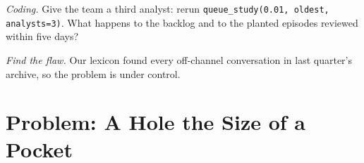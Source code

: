 \begin{exercise}[$\star\star\star$]\label{exo:pl:surveillance-and-compliance-technology:7}
\emph{Coding.} Give the team a third analyst: rerun \texttt{queue\_study(0.01, \textquotedbl oldest\textquotedbl, analysts=3)}.
What happens to the backlog and to the planted episodes reviewed within five days?
\end{exercise}

\begin{exercise}[$\star\star\star$]\label{exo:pl:surveillance-and-compliance-technology:8}
\emph{Find the flaw.} \textquotedbl{}Our lexicon found every off-channel conversation in last quarter's archive, so the problem is under
control.\textquotedbl{}
\end{exercise}

\section{Problem: A Hole the Size of a Pocket}

